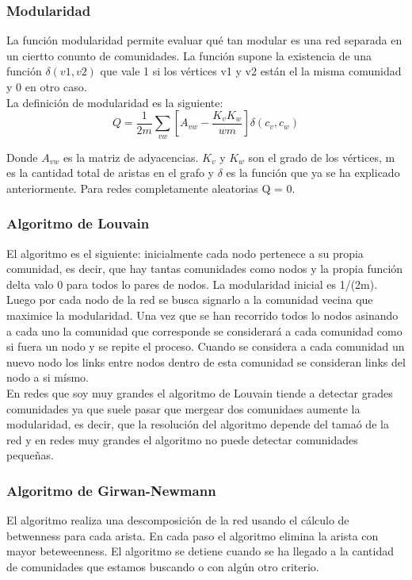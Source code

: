 \documentclass[titlepage,a4paper]{article}
\begin{document}
\subsubsection*{Modularidad}
La función modularidad  permite evaluar qué tan modular es una red separada en un ciertto conunto de comunidades. La función supone la existencia de una función $\delta(v1,v2)$ que vale 1 si los vértices v1 y v2 están el la misma comunidad y 0 en otro caso. \\

La definición de modularidad es la siguiente: $$ Q = \frac{1}{2m} \sum_{vw}[A_{vw} - \frac{K_v K_w}{wm}]\delta(c_v,c_w)$$

Donde $A_{vw}$ es la matriz de adyacencias. $K_v$ y $K_w$ son el grado de los vértices, m es la cantidad total de aristas en el grafo y $\delta$ es la función que ya se ha explicado anteriormente. Para redes completamente aleatorias Q = 0. 

\subsubsection*{Algoritmo de Louvain}
El algoritmo es el siguiente: inicialmente cada nodo pertenece a su propia comunidad, es decir, que hay tantas comunidades como nodos y la propia función delta valo 0 para todos lo pares de nodos. La modularidad inicial es 1/(2m). Luego por cada nodo de la red se busca signarlo a la comunidad vecina que maximice la modularidad. Una vez que se han recorrido todos lo nodos asinando a cada uno la comunidad que corresponde se considerará a cada comunidad como si fuera un nodo y se repite el proceso. Cuando se considera a cada comunidad un nuevo nodo los links entre nodos dentro de esta comunidad se consideran links del nodo a si mísmo. \\

En redes que soy muy grandes el algoritmo de Louvain tiende a detectar grades comunidades ya que suele pasar que mergear dos comunidaes aumente la modularidad, es decir, que la resolución del algoritmo depende del tamaó de la red y en redes muy grandes el algoritmo no puede detectar comunidades pequeñas. 

\subsubsection*{Algoritmo de Girwan-Newmann}
El algoritmo realiza una descomposición de la red usando el cálculo de betwenness para cada arista. En cada paso el algoritmo elimina la arista con mayor beteweenness. El algoritmo se detiene cuando se ha llegado a la cantidad de comunidades que estamos buscando o con algún otro criterio. 
\end{document}
